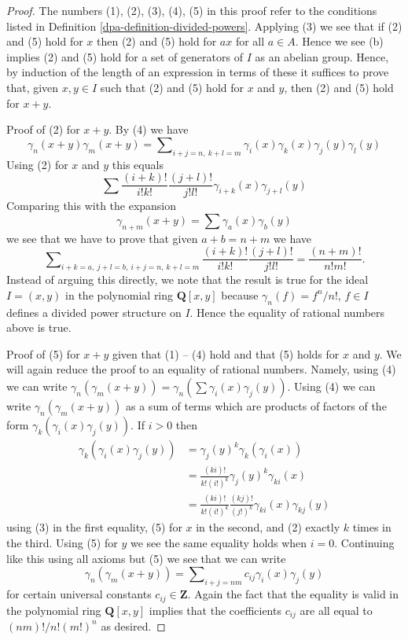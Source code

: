 \begin{proof}

The numbers (1), (2), (3), (4), (5) in this proof refer to the
conditions listed in Definition \ref{dpa-definition-divided-powers}.
Applying (3) we see that if (2) and (5) hold for $x$ then (2) and (5)
hold for $ax$ for all $a \in A$. Hence we see (b) implies
(2) and (5) hold for a set of generators
of $I$ as an abelian group. Hence, by induction of the length
of an expression in terms of these it suffices to prove that, given
$x, y \in I$ such that (2) and (5) hold for $x$ and $y$, then (2) and (5) hold
for $x + y$.

\medskip\noindent
Proof of (2) for $x + y$. By (4) we have
$$
\gamma_n(x + y)\gamma_m(x + y) =
\sum\nolimits_{i + j = n,\ k + l = m}
\gamma_i(x)\gamma_k(x)\gamma_j(y)\gamma_l(y)
$$
Using (2) for $x$ and $y$ this equals
$$
\sum \frac{(i + k)!}{i!k!}\frac{(j + l)!}{j!l!}
\gamma_{i + k}(x)\gamma_{j + l}(y)
$$
Comparing this with the expansion
$$
\gamma_{n + m}(x + y) = \sum \gamma_a(x)\gamma_b(y)
$$
we see that we have to prove that given $a + b = n + m$ we have
$$
\sum\nolimits_{i + k = a,\ j + l = b,\ i + j = n,\ k + l = m}
\frac{(i + k)!}{i!k!}\frac{(j + l)!}{j!l!}
=
\frac{(n + m)!}{n!m!}.
$$
Instead of arguing this directly, we note that the result is true
for the ideal $I = (x, y)$ in the polynomial ring $\mathbf{Q}[x, y]$
because $\gamma_n(f) = f^n/n!$, $f \in I$ defines a divided power
structure on $I$. Hence the equality of rational numbers above is true.

\medskip\noindent
Proof of (5) for $x + y$ given that (1) -- (4) hold and that (5)
holds for $x$ and $y$. We will again reduce the proof to an equality
of rational numbers. Namely, using (4) we can write
$\gamma_n(\gamma_m(x + y)) = \gamma_n(\sum \gamma_i(x)\gamma_j(y))$.
Using (4) we can write
$\gamma_n(\gamma_m(x + y))$ as a sum of terms which are products of
factors of the form $\gamma_k(\gamma_i(x)\gamma_j(y))$.
If $i > 0$ then
\begin{align*}
\gamma_k(\gamma_i(x)\gamma_j(y)) & =
\gamma_j(y)^k\gamma_k(\gamma_i(x)) \\
& = \frac{(ki)!}{k!(i!)^k} \gamma_j(y)^k \gamma_{ki}(x) \\
& =
\frac{(ki)!}{k!(i!)^k} \frac{(kj)!}{(j!)^k} \gamma_{ki}(x) \gamma_{kj}(y)
\end{align*}
using (3) in the first equality, (5) for $x$ in the second, and
(2) exactly $k$ times in the third. Using (5) for $y$ we see the
same equality holds when $i = 0$. Continuing like this using all
axioms but (5) we see that we can write
$$
\gamma_n(\gamma_m(x + y)) =
\sum\nolimits_{i + j = nm} c_{ij}\gamma_i(x)\gamma_j(y)
$$
for certain universal constants $c_{ij} \in \mathbf{Z}$. Again the fact
that the equality is valid in the polynomial ring $\mathbf{Q}[x, y]$
implies that the coefficients $c_{ij}$ are all equal to $(nm)!/n!(m!)^n$
as desired.
\end{proof}

